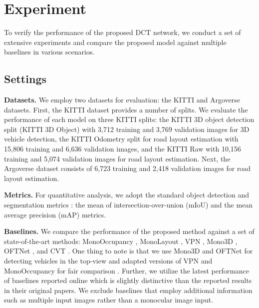 \section{Experiment}

To verify the performance of the proposed DCT network, we conduct a set of extensive experiments and compare the proposed model against multiple baselines in various scenarios.

\subsection{Settings}
\textbf{Datasets.} We employ two datasets for evaluation: the KITTI \cite{geiger2012we} and Argoverse \cite{chang2019argoverse} datasets. First, the KITTI dataset provides a number of splits. We evaluate the performance of each model on three KITTI splits: the KITTI 3D object detection split (KITTI 3D Object) \cite{chen2016monocular} with 3,712 training and 3,769 validation images for 3D vehicle detection, the KITTI Odometry split for road layout estimation with 15,806 training and 6,636 validation images, and the KITTI Raw \cite{schulter2018learning} with 10,156 training and 5,074 validation images for road layout estimation. Next, the Argoverse dataset consists of 6,723 training and 2,418 validation images for road layout estimation.

\textbf{Metrics.} For quantitative analysis, we adopt the standard object detection and segmentation metrics \cite{lin2014microsoft}: the mean of intersection-over-union (mIoU) and the mean average precision (mAP) metrics.


\textbf{Baselines.} We compare the performance of the proposed method against a set of state-of-the-art methods: MonoOccupancy \cite{lu2019monocular}, MonoLayout \cite{mani2020monolayout}, VPN \cite{pan2020cross}, Mono3D \cite{chen2016monocular}, OFTNet \cite{roddick2019orthographic}, and CVT \cite{yang2021projecting}. One thing to note is that we use Mono3D \cite{chen2016monocular} and  OFTNet \cite{roddick2019orthographic} for detecting vehicles in the top-view and adapted versions of VPN \cite{pan2020cross} and MonoOccupancy \cite{lu2019monocular} for fair comparison \cite{yang2021projecting}. Further, we utilize the latest performance of baselines reported online which is slightly distinctive than the reported results in their original papers. We exclude baselines that employ additional information such as multiple input images \cite{zhao2022jperceiver, saha2022translating} rather than a monocular image input.


